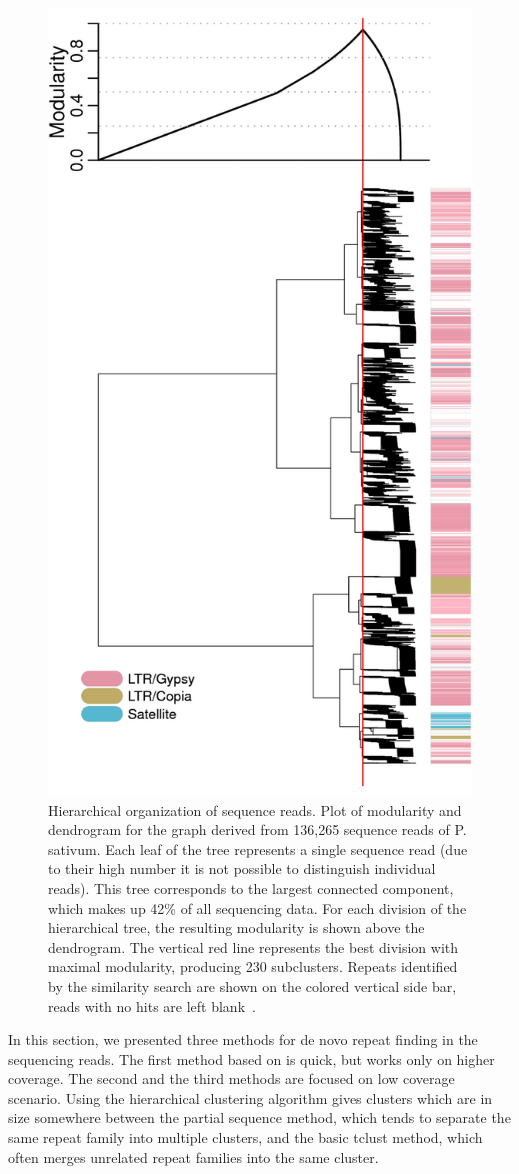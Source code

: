 \begin{figure}[htbp]
  \centering
  \includegraphics[width=.5\textwidth]{../figures/repeat-clustering}
  \caption[Hierarchical organization of sequence reads]{Hierarchical organization of sequence reads. Plot of modularity and dendrogram for the graph derived from 136,265 sequence reads of P. sativum. Each leaf of the tree represents a single sequence read (due to their high number it is not possible to distinguish individual reads). This tree corresponds to the largest connected component, which makes up 42\% of all sequencing data. For each division of the hierarchical tree, the resulting modularity is shown above the dendrogram. The vertical red line represents the best division with maximal modularity, producing 230 subclusters. Repeats identified by the similarity search are shown on the colored vertical side bar, reads with no hits are left blank~\cite{novak2010graph}.}\label{fig:repeat-clustering}
\end{figure}

In this section, we presented three methods for de novo repeat finding in the sequencing reads. The first method based on  is quick, but works only on higher coverage. The second and the third methods are focused on low coverage scenario. Using the hierarchical clustering algorithm gives clusters which are in size somewhere between the partial sequence method, which tends to separate the same repeat family into multiple clusters, and the basic tclust method, which often merges unrelated repeat families into the same cluster.

